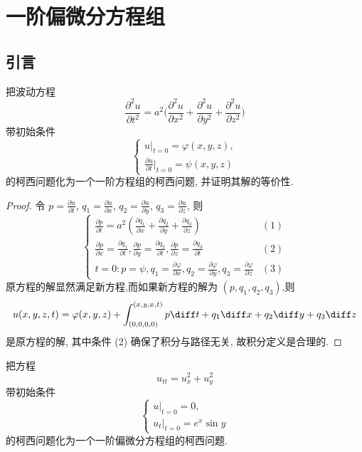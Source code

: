 \chapter{一阶偏微分方程组}

\section{引言}

\begin{exercise}
  把波动方程
  \[\frac{\partial^2u}{\partial t^2} = a^2 
    \biggl(\frac{\partial^2u}{\partial x^2} + \frac{\partial^2u}{\partial y^2}
    + \frac{\partial^2u}{\partial z^2}\biggr)\]
  带初始条件
  \[\begin{cases}
    u|_{t=0} = \varphi(x,y,z), \\
    \frac{\partial u}{\partial t}|_{t=0} = \psi(x,y,z)
  \end{cases}\]
  的柯西问题化为一个一阶方程组的柯西问题, 并证明其解的等价性.
\end{exercise}

\begin{proof}
  令 $p=\frac{\partial u}{\partial t}$, $q_1=\frac{\partial u}{\partial x}$,
  $q_2=\frac{\partial u}{\partial y}$, $q_3=\frac{\partial u}{\partial z}$, 则
  \[\begin{cases}
    \frac{\partial p}{\partial t} = a^2\left(\frac{\partial q_1}{\partial x}
      +\frac{\partial q_2}{\partial y}+\frac{\partial q_3}{\partial z}\right) & (1) \\
    \frac{\partial p}{\partial x} = \frac{\partial q_1}{\partial t},
    \frac{\partial p}{\partial y}=\frac{\partial q_2}{\partial t},
    \frac{\partial p}{\partial z}=\frac{\partial q_3}{\partial t} & (2) \\
    t = 0: p=\psi, q_1 = \frac{\partial\varphi}{\partial x},
                   q_2 = \frac{\partial\varphi}{\partial y},
                   q_3 = \frac{\partial\varphi}{\partial z} & (3)
  \end{cases}\]
  原方程的解显然满足新方程,而如果新方程的解为 $(p,q_1,q_2,q_3)$,则
  \[u(x,y,z,t) = \varphi(x,y,z)
    + \int_{(0,0,0,0)}^{(x,y,x,t)}p\diff t+q_1\diff x+q_2\diff y+q_3\diff z\]
  是原方程的解, 其中条件 (2) 确保了积分与路径无关, 故积分定义是合理的.
\end{proof}


\begin{exercise}
  把方程
  \[ u_{tt} = u_{x}^2 + u_{y}^2 \]
  带初始条件
  \[\begin{cases}
    u|_{t=0} = 0, \\
    u_t|_{t=0} = e^x \sin y
  \end{cases}\]
  的柯西问题化为一个一阶偏微分方程组的柯西问题.
\end{exercise}

